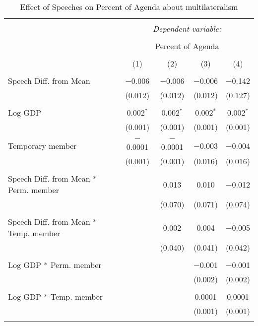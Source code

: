 
\begin{table}[!htbp] \centering 
  \caption{Effect of Speeches on Percent of Agenda about multilateralism} 
  \label{} 
\begin{tabular}{@{\extracolsep{5pt}}lcccc} 
\\[-1.8ex]\hline 
\hline \\[-1.8ex] 
 & \multicolumn{4}{c}{\textit{Dependent variable:}} \\ 
\cline{2-5} 
\\[-1.8ex] & \multicolumn{4}{c}{Percent of Agenda} \\ 
\\[-1.8ex] & (1) & (2) & (3) & (4)\\ 
\hline \\[-1.8ex] 
 Speech Diff. from Mean & $-$0.006 & $-$0.006 & $-$0.006 & $-$0.142 \\ 
  & (0.012) & (0.012) & (0.012) & (0.127) \\ 
  & & & & \\ 
 Log GDP & 0.002$^{*}$ & 0.002$^{*}$ & 0.002$^{*}$ & 0.002$^{*}$ \\ 
  & (0.001) & (0.001) & (0.001) & (0.001) \\ 
  & & & & \\ 
 Temporary member & $-$0.0001 & $-$0.0001 & $-$0.003 & $-$0.004 \\ 
  & (0.001) & (0.001) & (0.016) & (0.016) \\ 
  & & & & \\ 
 Speech Diff. from Mean * Perm. member &  & 0.013 & 0.010 & $-$0.012 \\ 
  &  & (0.070) & (0.071) & (0.074) \\ 
  & & & & \\ 
 Speech Diff. from Mean * Temp. member &  & 0.002 & 0.004 & $-$0.005 \\ 
  &  & (0.040) & (0.041) & (0.042) \\ 
  & & & & \\ 
 Log GDP * Perm. member &  &  & $-$0.001 & $-$0.001 \\ 
  &  &  & (0.002) & (0.002) \\ 
  & & & & \\ 
 Log GDP * Temp. member &  &  & 0.0001 & 0.0001 \\ 
  &  &  & (0.001) & (0.001) \\ 
  & & & & \\ 

\end{tabular}
\end{table}
